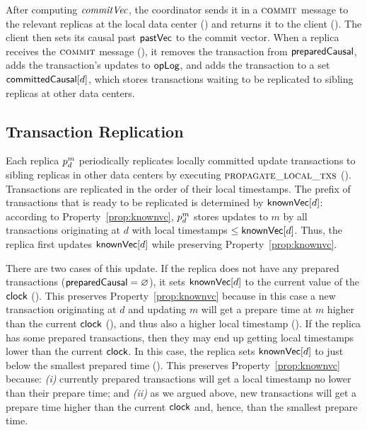 After computing $\commitvector$, the coordinator sends it in a $\textsc{commit}$ message
to the relevant replicas at the local data center
() and returns it to the client
(). The client then sets its
causal past ${\sf pastVec}$ to the commit vector. When a replica receives the $\textsc{commit}$
message (), it removes the
transaction from ${\sf preparedCausal}$, adds the transaction's updates to ${\sf opLog}$,
and adds the transaction to a set ${\sf committedCausal}[d]$, which stores transactions
waiting to be replicated to sibling replicas at other data centers.










              


\subsection{Transaction Replication}
\label{sec:replication}

Each replica $\partition^m_d$ periodically replicates locally committed update
transactions to sibling replicas in other data centers by executing
$\textsc{propagate\_local\_txs}$ (). Transactions
are replicated in the order of their local timestamps. The prefix of
transactions that is ready to be replicated is determined by
${\sf knownVec}[d]$: according to Property~\ref{prop:knownvc},
$\partition^m_d$ stores updates to $m$ by all transactions originating at $d$
with local timestamps $\leq {\sf knownVec}[d]$. Thus, the replica first
updates ${\sf knownVec}[d]$ while preserving Property~\ref{prop:knownvc}.

There are two cases of this update. If the replica does not have any prepared
transactions (${\sf preparedCausal}=\varnothing$), it sets ${\sf knownVec}[d]$ to
the current value of the ${\sf clock}$
(). This preserves
Property~\ref{prop:knownvc} because in this case a new transaction originating
at $d$ and updating $m$ will get a prepare time at $m$ higher than the current
${\sf clock}$ (), and thus also a higher
local timestamp (). If the
replica has some prepared transactions, then they may end up getting local
timestamps lower than the current ${\sf clock}$. In this case, the replica sets
${\sf knownVec}[d]$ to just below the smallest prepared time
(). This preserves
Property~\ref{prop:knownvc} because: {\em (i)} currently prepared transactions
will get a local timestamp no lower than their prepare time; and {\em (ii)} as
we argued above, new transactions will get a prepare time higher than the
current ${\sf clock}$ and, hence, than the smallest prepare time.


